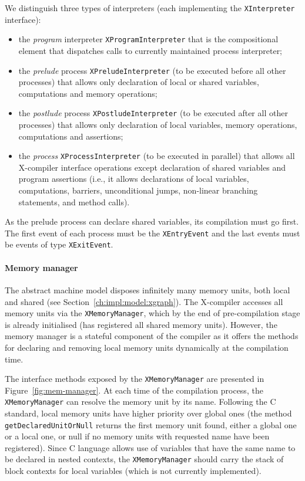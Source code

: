 We distinguish three types of interpreters (each implementing the \texttt{XInterpreter} interface):
\begin{itemize}[noitemsep,topsep=0pt]
\item the \textit{program} interpreter \texttt{XProgramInterpreter} that is the compositional element that dispatches calls to currently maintained process interpreter;
\item the \textit{prelude} process \texttt{XPreludeInterpreter} (to be executed before all other processes) that allows only declaration of local or shared variables, computations and memory operations;
\item the \textit{postlude} process \texttt{XPostludeInterpreter} (to be executed after all other processes) that allows only declaration of local variables, memory operations, computations and assertions;
\item the \textit{process} \texttt{XProcessInterpreter} (to be executed in parallel) that allows all X-compiler interface operations except declaration of shared variables
and program assertions (i.e., it allows declarations of local variables, computations, barriers, unconditional jumps, non-linear branching statements, and method calls).
\end{itemize}

As the prelude process can declare shared variables, its compilation must go first.
The first event of each process must be the \texttt{XEntryEvent} and the last events must be events of type \texttt{XExitEvent}.


\paragraph{Memory manager}

The \xgraph{} abstract machine model disposes infinitely many memory units, both local and shared (see Section~\ref{ch:impl:model:xgraph}).
The X-compiler accesses all memory units via the \texttt{XMemoryManager}, which by the end of pre-compilation stage is already initialised (has registered all shared memory units).
However, the memory manager is a stateful component of the compiler as it offers the methods for declaring and removing local memory units dynamically at the compilation time.

The interface methods exposed by the \texttt{XMemoryManager} are presented in Figure~\ref{fig:mem-manager}.
At each time of the compilation process, the \texttt{XMemoryManager} can resolve the memory unit by its name.
Following the C standard, local memory units have higher priority over global ones (the method \lstinline{getDeclaredUnitOrNull} returns the first memory unit found, either a global one or a local one, or null if no memory units with requested name have been registered).
Since C language allows use of variables that have the same name to be declared in nested contexts, the \texttt{XMemoryManager} should carry the stack of block contexts for local variables (which is not currently implemented).

